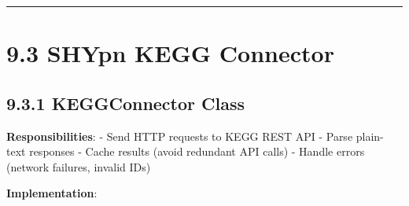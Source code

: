 \begin{center}\rule{0.5\linewidth}{0.5pt}\end{center}

\hypertarget{shypn-kegg-connector}{%
\section{9.3 SHYpn KEGG Connector}\label{shypn-kegg-connector}}

\hypertarget{keggconnector-class}{%
\subsection{9.3.1 KEGGConnector Class}\label{keggconnector-class}}

\textbf{Responsibilities}: - Send HTTP requests to KEGG REST API - Parse
plain-text responses - Cache results (avoid redundant API calls) -
Handle errors (network failures, invalid IDs)

\textbf{Implementation}:

